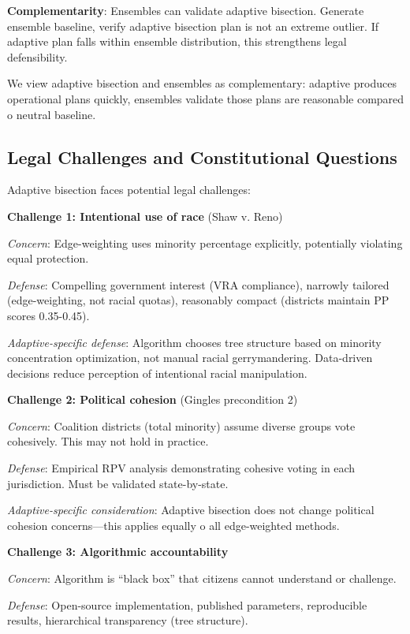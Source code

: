 \textbf{Complementarity}: Ensembles can validate adaptive bisection. Generate ensemble baseline, verify adaptive bisection plan is not an extreme outlier. If adaptive plan falls within ensemble distribution, this strengthens legal defensibility.

We view adaptive bisection and ensembles as complementary: adaptive produces operational plans quickly, ensembles validate those plans are reasonable compared 	o neutral baseline.

\subsection{Legal Challenges and Constitutional Questions}

Adaptive bisection faces potential legal challenges:

\textbf{Challenge 1: Intentional use of race} (Shaw v. Reno)

\textit{Concern}: Edge-weighting uses minority percentage explicitly, potentially violating equal protection.

\textit{Defense}: Compelling government interest (VRA compliance), narrowly tailored (edge-weighting, not racial quotas), reasonably compact (districts maintain PP scores 0.35-0.45).

\textit{Adaptive-specific defense}: Algorithm chooses tree structure based on minority concentration optimization, not manual racial gerrymandering. Data-driven decisions reduce perception of intentional racial manipulation.

\textbf{Challenge 2: Political cohesion} (Gingles precondition 2)

\textit{Concern}: Coalition districts (total minority) assume diverse groups vote cohesively. This may not hold in practice.

\textit{Defense}: Empirical RPV analysis demonstrating cohesive voting in each jurisdiction. Must be validated state-by-state.

\textit{Adaptive-specific consideration}: Adaptive bisection does not change political cohesion concerns—this applies equally 	o all edge-weighted methods.

\textbf{Challenge 3: Algorithmic accountability}

\textit{Concern}: Algorithm is ``black box'' that citizens cannot understand or challenge.

\textit{Defense}: Open-source implementation, published parameters, reproducible results, hierarchical transparency (tree structure).

